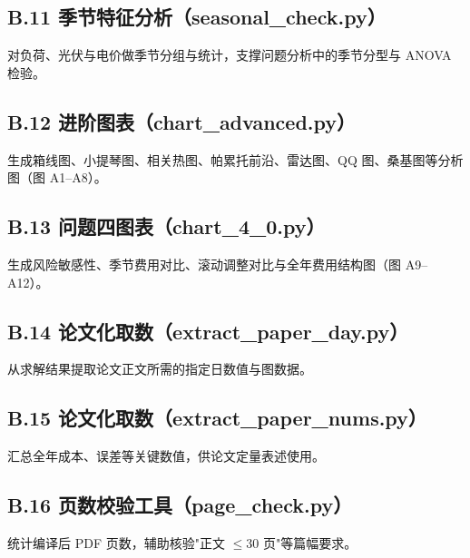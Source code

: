 \documentclass[withoutpreface]{cumcmthesis}
\begin{document}
\begin{appendices}
\subsection{B.11 季节特征分析（seasonal\_check.py）}\label{app:seasoncheck}
对负荷、光伏与电价做季节分组与统计，支撑问题分析中的季节分型与 ANOVA 检验。


\subsection{B.12 进阶图表（chart\_advanced.py）}\label{app:chartadv}
生成箱线图、小提琴图、相关热图、帕累托前沿、雷达图、QQ 图、桑基图等分析图（图 A1--A8）。


\subsection{B.13 问题四图表（chart\_4\_0.py）}\label{app:chart40}
生成风险敏感性、季节费用对比、滚动调整对比与全年费用结构图（图 A9--A12）。


\subsection{B.14 论文化取数（extract\_paper\_day.py）}\label{app:exday}
从求解结果提取论文正文所需的指定日数值与图数据。


\subsection{B.15 论文化取数（extract\_paper\_nums.py）}\label{app:exnums}
汇总全年成本、误差等关键数值，供论文定量表述使用。


\subsection{B.16 页数校验工具（page\_check.py）}\label{app:pagecheck}
统计编译后 PDF 页数，辅助核验"正文 $\le 30$ 页"等篇幅要求。


\end{appendices}
\end{document}

